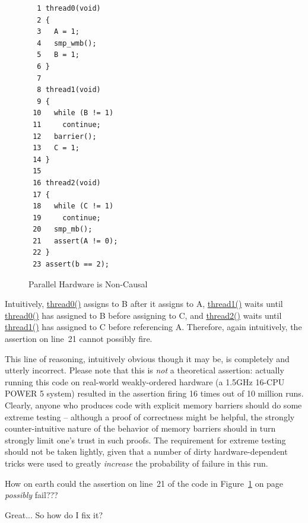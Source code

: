 \begin{figure}[htbp]
{ \centering
\begin{verbatim}
  1 thread0(void)
  2 {
  3   A = 1;
  4   smp_wmb();
  5   B = 1;
  6 }
  7
  8 thread1(void)
  9 {
 10   while (B != 1)
 11     continue;
 12   barrier();
 13   C = 1;
 14 }
 15
 16 thread2(void)
 17 {
 18   while (C != 1)
 19     continue;
 20   smp_mb();
 21   assert(A != 0);
 22 }
 23 assert(b == 2);
\end{verbatim}
}
\caption{Parallel Hardware is Non-Causal}
\label{fig:advsync:Parallel Hardware is Non-Causal}
\end{figure}

Intuitively, \url{thread0()} assigns to B after it assigns to A,
\url{thread1()} waits until \url{thread0()} has assigned to B before
assigning to C, and \url{thread2()} waits until \url{thread1()} has
assigned to C before referencing A.
Therefore, again intuitively, the assertion on line~21 cannot possibly
fire.

This line of reasoning, intuitively obvious though it may be, is completely
and utterly incorrect.
Please note that this is \emph{not} a theoretical assertion:
actually running this code on real-world weakly-ordered hardware
(a 1.5GHz 16-CPU POWER 5 system) resulted in the assertion firing
16 times out of 10 million runs.
Clearly, anyone who produces code with explicit memory barriers
should do some extreme testing -- although a proof of correctness might
be helpful, the strongly counter-intuitive nature of the behavior of
memory barriers should in turn strongly limit one's trust in such proofs.
The requirement for extreme testing should not be taken lightly, given
that a number of dirty hardware-dependent tricks were used to
greatly \emph{increase} the probability of failure in this run.

\QuickQuiz{}
	How on earth could the assertion on line~21 of the code in
	Figure~\ref{fig:advsync:Parallel Hardware is Non-Causal} on
	page~\pageref{fig:advsync:Parallel Hardware is Non-Causal}
	\emph{possibly} fail???
 \QuickQuizEnd

\QuickQuiz{}
	Great...  So how do I fix it?
 \QuickQuizEnd

